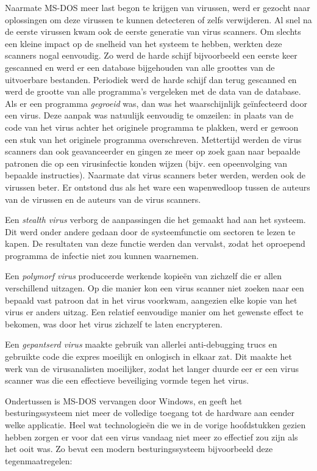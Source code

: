 Naarmate MS-DOS meer last begon te krijgen van virussen, werd er gezocht naar oplossingen om deze virussen te kunnen detecteren of zelfs verwijderen. Al snel na de eerste virussen kwam ook de eerste generatie van virus scanners. Om slechts een kleine impact op de snelheid van het systeem te hebben, werkten deze scanners nogal eenvoudig. Zo werd de harde schijf bijvoorbeeld een eerste keer gescanned en werd er een database bijgehouden van alle groottes van de uitvoerbare bestanden. Periodiek werd de harde schijf dan terug gescanned en werd de grootte van alle programma's vergeleken met de data van de database. Als er een programma \emph{gegroeid} was, dan was het waarschijnlijk ge\"infecteerd door een virus. Deze aanpak was natuulijk eenvoudig te omzeilen: in plaats van de code van het virus achter het originele programma te plakken, werd er gewoon een stuk van het originele programma overschreven. Mettertijd werden de virus scanners dan ook geavanceerder en gingen ze meer op zoek gaan naar bepaalde patronen die op een virusinfectie konden wijzen (bijv. een opeenvolging van bepaalde instructies). Naarmate dat virus scanners beter werden, werden ook de virussen beter. Er ontstond dus als het ware een wapenwedloop tussen de auteurs van de virussen en de auteurs van de virus scanners.

Een \emph{stealth virus} verborg de aanpassingen die het gemaakt had aan het systeem. Dit werd onder andere gedaan door de systeemfunctie om sectoren te lezen te kapen. De resultaten van deze functie werden dan vervalst, zodat het oproepend programma de infectie niet zou kunnen waarnemen.

Een \emph{polymorf virus} produceerde werkende kopie\"en van zichzelf die er allen verschillend uitzagen. Op die manier kon een virus scanner niet zoeken naar een bepaald vast patroon dat in het virus voorkwam, aangezien elke kopie van het virus er anders uitzag. Een relatief eenvoudige manier om het gewenste effect te bekomen, was door het virus zichzelf te laten encrypteren.

Een \emph{gepantserd virus} maakte gebruik van allerlei anti-debugging trucs en gebruikte code die expres moeilijk en onlogisch in elkaar zat. Dit maakte het werk van de virusanalisten moeilijker, zodat het langer duurde eer er een virus scanner was die een effectieve beveiliging vormde tegen het virus.

Ondertussen is MS-DOS vervangen door Windows, en geeft het besturingssysteem niet meer de volledige toegang tot de hardware aan eender welke applicatie. Heel wat technologie\"en die we in de vorige hoofdstukken gezien hebben zorgen er voor dat een virus vandaag niet meer zo effectief zou zijn als het ooit was. Zo bevat een modern besturingssysteem bijvoorbeeld deze tegenmaatregelen:

